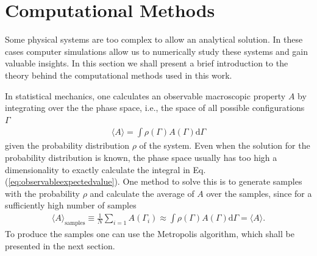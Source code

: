 \section{Computational Methods}
\label{sec:compmethods}
Some physical systems are too complex to allow an analytical solution. In these cases computer simulations allow us to numerically study these systems and gain valuable insights. In this section we shall present a brief introduction to the theory behind the computational methods used in this work.

In statistical mechanics, one calculates an observable macroscopic property $A$ by integrating over the the phase space, i.e., the space of all possible configurations $\Gamma$
\begin{align}
\label{eq:observableexpectedvalue}
\langle A\rangle = \int \rho\left(\Gamma\right)  A\left(\Gamma\right) \mathrm{d}\Gamma
\end{align}
given the probability distribution $\rho$ of the system. Even when the solution for the probability distribution is known, the phase space usually has too high a dimensionality to exactly calculate the integral in Eq.(\ref{eq:observableexpectedvalue}). One method to solve this is to generate samples with the probability $\rho$ and calculate the average of $A$ over the samples, since for a sufficiently high number of samples
\begin{align*}
    \langle A\rangle_{\text{samples}}\equiv\frac{1}{N} \displaystyle\sum_{i=1}A(\Gamma_i) \approx \int \rho\left(\Gamma\right)  A\left(\Gamma\right) \mathrm{d}\Gamma =\langle A\rangle.
\end{align*}
To produce the samples one can use the Metropolis algorithm, which shall be presented in the next section.


